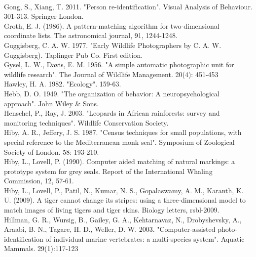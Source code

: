 \documentclass[11pt]{article}
\begin{document}
\\
Gong, S., Xiang, T. 2011. "Person re-identification". Visual Analysis of Behaviour. 301-313. Springer London.
\newline
\\
Groth, E. J. (1986). A pattern-matching algorithm for two-dimensional coordinate lists. The astronomical journal, 91, 1244-1248.
\newline
\\
Guggisberg, C. A. W. 1977. "Early Wildlife Photographers by C. A. W. Guggisberg). Taplinger Pub Co. First edition.
\newline
\\
Gysel, L. W., Davis, E. M. 1956. "A simple automatic photographic unit for wildlife research". The Journal of Wildlife Management. 20(4): 451-453
\newline
\\
Hawley, H. A. 1982. "Ecology". 159-63.
\newline
\\
Hebb, D. O. 1949. "The organization of behavior: A neuropsychological approach". John Wiley \& Sons.
\newline
\\
Henschel, P., Ray, J. 2003. "Leopards in African rainforests: survey and monitoring techniques". Wildlife Conservation Society.
\newline
\\
Hiby, A. R., Jeffery, J. S. 1987. "Census techniques for small populations, with special reference to the Mediterranean monk seal". Symposium of Zoological Society of London. 58: 193-210.
\newline
\\
Hiby, L., Lovell, P. (1990). Computer aided matching of natural markings: a prototype system for grey seals. Report of the International Whaling Commission, 12, 57-61.
\newline
\\
Hiby, L., Lovell, P., Patil, N., Kumar, N. S., Gopalaswamy, A. M., Karanth, K. U. (2009). A tiger cannot change its stripes: using a three-dimensional model to match images of living tigers and tiger skins. Biology letters, rsbl-2009.
\newline
\\
Hillman, G. R., Wursig, B., Gailey, G. A., Kehtarnavaz, N., Drobyshevsky, A., Araabi, B. N., Tagare, H. D., Weller, D. W. 2003. "Computer-assisted photo-identification of individual marine vertebrates: a multi-species system". Aquatic Mammals. 29(1):117-123
\newline
\end{document}
